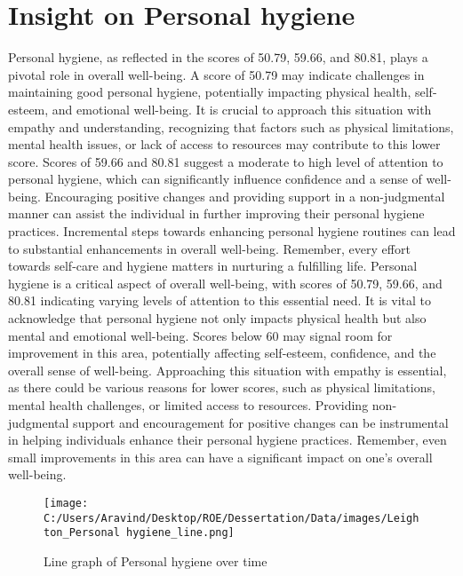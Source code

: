 \documentclass[10pt, a4paper]{article}%
\begin{document}
%
\section{Insight on Personal hygiene}%
\label{sec:InsightonPersonalhygiene}%
Personal hygiene, as reflected in the scores of 50.79, 59.66, and 80.81, plays a pivotal role in overall well{-}being. A score of 50.79 may indicate challenges in maintaining good personal hygiene, potentially impacting physical health, self{-}esteem, and emotional well{-}being. It is crucial to approach this situation with empathy and understanding, recognizing that factors such as physical limitations, mental health issues, or lack of access to resources may contribute to this lower score.\newline%
\newline%
Scores of 59.66 and 80.81 suggest a moderate to high level of attention to personal hygiene, which can significantly influence confidence and a sense of well{-}being. Encouraging positive changes and providing support in a non{-}judgmental manner can assist the individual in further improving their personal hygiene practices. Incremental steps towards enhancing personal hygiene routines can lead to substantial enhancements in overall well{-}being. Remember, every effort towards self{-}care and hygiene matters in nurturing a fulfilling life.\newline%
\newline%
Personal hygiene is a critical aspect of overall well{-}being, with scores of 50.79, 59.66, and 80.81 indicating varying levels of attention to this essential need. It is vital to acknowledge that personal hygiene not only impacts physical health but also mental and emotional well{-}being. Scores below 60 may signal room for improvement in this area, potentially affecting self{-}esteem, confidence, and the overall sense of well{-}being.\newline%
\newline%
Approaching this situation with empathy is essential, as there could be various reasons for lower scores, such as physical limitations, mental health challenges, or limited access to resources. Providing non{-}judgmental support and encouragement for positive changes can be instrumental in helping individuals enhance their personal hygiene practices. Remember, even small improvements in this area can have a significant impact on one's overall well{-}being.%


\begin{figure}[H]%
\centering%
\texttt{[image: C:/Users/Aravind/Desktop/ROE/Dessertation/Data/images/Leighton\_Personal hygiene\_line.png]}%
\caption{Line graph of Personal hygiene over time}%
\end{figure}
\end{document}
